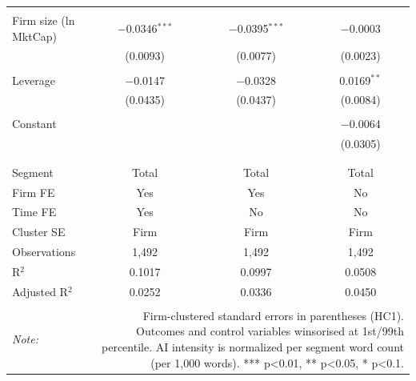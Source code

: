 \begin{table}[!htbp]
\begin{tabular}{@{\extracolsep{5pt}}lccc}
  & & & \\ 
 Firm size (ln MktCap) & $-$0.0346$^{***}$ & $-$0.0395$^{***}$ & $-$0.0003 \\ 
  & (0.0093) & (0.0077) & (0.0023) \\ 
  & & & \\ 
 Leverage & $-$0.0147 & $-$0.0328 & 0.0169$^{**}$ \\ 
  & (0.0435) & (0.0437) & (0.0084) \\ 
  & & & \\ 
 Constant &  &  & $-$0.0064 \\ 
  &  &  & (0.0305) \\ 
  & & & \\ 
\hline \\[-1.8ex] 
Segment & Total & Total & Total \\ 
Firm FE & Yes & Yes & No \\ 
Time FE & Yes & No & No \\ 
Cluster SE & Firm & Firm & Firm \\ 
Observations & 1,492 & 1,492 & 1,492 \\ 
R$^{2}$ & 0.1017 & 0.0997 & 0.0508 \\ 
Adjusted R$^{2}$ & 0.0252 & 0.0336 & 0.0450 \\ 
\hline 
\hline \\[-1.8ex] 
\textit{Note:}  & \multicolumn{3}{r}{Firm-clustered standard errors in parentheses (HC1). Outcomes and control variables winsorised at 1st/99th percentile. AI intensity is normalized per segment word count (per 1,000 words). *** p<0.01, ** p<0.05, * p<0.1.} \\ 
\end{tabular} 
\end{table} 
